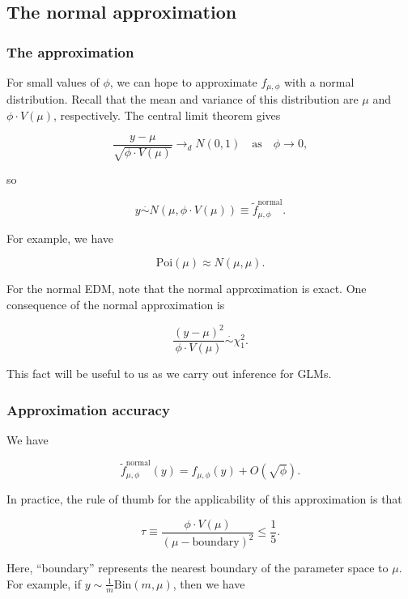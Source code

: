 \documentclass[
  11pt,
  letterpaper,
  oneside]{book}
\theoremstyle{plain}
\theoremstyle{plain}
\theoremstyle{definition}
\theoremstyle{definition}
\theoremstyle{plain}
\theoremstyle{remark}
\begin{document}
\hypertarget{the-normal-approximation}{%
\subsection{The normal approximation}\label{the-normal-approximation}}

\hypertarget{the-approximation}{%
\subsubsection{The approximation}\label{the-approximation}}

For small values of \(\phi\), we can hope to approximate
\(f_{\mu, \phi}\) with a normal distribution. Recall that the mean and
variance of this distribution are \(\mu\) and \(\phi \cdot V(\mu)\),
respectively. The central limit theorem gives

\[
\frac{y - \mu}{\sqrt{\phi \cdot V(\mu)}} \rightarrow_d N(0,1) \quad \text{as} \quad \phi \rightarrow 0,
\]

so

\[
y \overset \cdot \sim N(\mu, \phi \cdot V(\mu)) \equiv \tilde f^{\text{normal}}_{\mu, \phi}.
\]

For example, we have

\[
\text{Poi}(\mu) \approx N(\mu, \mu).
\]

For the normal EDM, note that the normal approximation is exact. One
consequence of the normal approximation is

\[
\frac{(y - \mu)^2}{\phi \cdot V(\mu)} \overset \cdot \sim \chi^2_1.
\]

This fact will be useful to us as we carry out inference for GLMs.

\hypertarget{approximation-accuracy}{%
\subsubsection{Approximation accuracy}\label{approximation-accuracy}}

We have

\[
\tilde f^{\text{normal}}_{\mu, \phi}(y) = f_{\mu, \phi}(y) + O(\sqrt{\phi}).
\]

In practice, the rule of thumb for the applicability of this
approximation is that

\[
\tau \equiv \frac{\phi \cdot V(\mu)}{(\mu - \text{boundary})^2} \leq \frac{1}{5}.
\]

Here, ``boundary'' represents the nearest boundary of the parameter
space to \(\mu\). For example, if
\(y \sim \frac{1}{m}\text{Bin}(m, \mu)\), then we have
\end{document}
